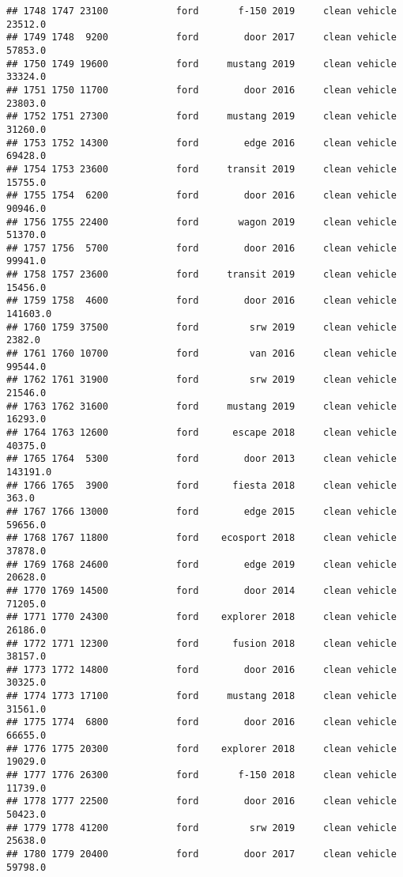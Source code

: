\documentclass[
]{article}
\begin{document}
\begin{verbatim}
## 1748 1747 23100            ford       f-150 2019     clean vehicle   23512.0
## 1749 1748  9200            ford        door 2017     clean vehicle   57853.0
## 1750 1749 19600            ford     mustang 2019     clean vehicle   33324.0
## 1751 1750 11700            ford        door 2016     clean vehicle   23803.0
## 1752 1751 27300            ford     mustang 2019     clean vehicle   31260.0
## 1753 1752 14300            ford        edge 2016     clean vehicle   69428.0
## 1754 1753 23600            ford     transit 2019     clean vehicle   15755.0
## 1755 1754  6200            ford        door 2016     clean vehicle   90946.0
## 1756 1755 22400            ford       wagon 2019     clean vehicle   51370.0
## 1757 1756  5700            ford        door 2016     clean vehicle   99941.0
## 1758 1757 23600            ford     transit 2019     clean vehicle   15456.0
## 1759 1758  4600            ford        door 2016     clean vehicle  141603.0
## 1760 1759 37500            ford         srw 2019     clean vehicle    2382.0
## 1761 1760 10700            ford         van 2016     clean vehicle   99544.0
## 1762 1761 31900            ford         srw 2019     clean vehicle   21546.0
## 1763 1762 31600            ford     mustang 2019     clean vehicle   16293.0
## 1764 1763 12600            ford      escape 2018     clean vehicle   40375.0
## 1765 1764  5300            ford        door 2013     clean vehicle  143191.0
## 1766 1765  3900            ford      fiesta 2018     clean vehicle     363.0
## 1767 1766 13000            ford        edge 2015     clean vehicle   59656.0
## 1768 1767 11800            ford    ecosport 2018     clean vehicle   37878.0
## 1769 1768 24600            ford        edge 2019     clean vehicle   20628.0
## 1770 1769 14500            ford        door 2014     clean vehicle   71205.0
## 1771 1770 24300            ford    explorer 2018     clean vehicle   26186.0
## 1772 1771 12300            ford      fusion 2018     clean vehicle   38157.0
## 1773 1772 14800            ford        door 2016     clean vehicle   30325.0
## 1774 1773 17100            ford     mustang 2018     clean vehicle   31561.0
## 1775 1774  6800            ford        door 2016     clean vehicle   66655.0
## 1776 1775 20300            ford    explorer 2018     clean vehicle   19029.0
## 1777 1776 26300            ford       f-150 2018     clean vehicle   11739.0
## 1778 1777 22500            ford        door 2016     clean vehicle   50423.0
## 1779 1778 41200            ford         srw 2019     clean vehicle   25638.0
## 1780 1779 20400            ford        door 2017     clean vehicle   59798.0

\end{verbatim}
\end{document}
